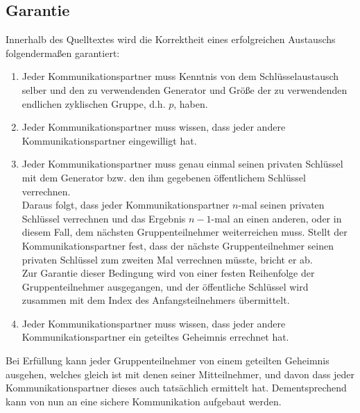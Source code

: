 \documentclass[conference]{IEEEtran}
\begin{document}
\subsection{Garantie}

Innerhalb des Quelltextes wird die Korrektheit eines erfolgreichen Austauschs folgendermaßen garantiert:

\begin{enumerate}
    \item Jeder Kommunikationspartner muss Kenntnis von dem Schlüsselaustausch selber und den zu verwendenden Generator und Größe der zu verwendenden endlichen zyklischen Gruppe, d.h. $p$, haben.
    \item Jeder Kommunikationspartner muss wissen, dass jeder andere Kommunikationspartner eingewilligt hat.
    \item Jeder Kommunikationspartner muss genau einmal seinen privaten Schlüssel
        mit dem Generator bzw. den ihm gegebenen öffentlichem Schlüssel verrechnen.\\
        Daraus folgt, dass jeder Kommunikationspartner $n$-mal seinen privaten
        Schlüssel verrechnen und das Ergebnis $n - 1$-mal an einen anderen,
        oder in diesem Fall, dem nächsten Gruppenteilnehmer weiterreichen muss.
        Stellt der Kommunikationspartner fest,
        dass der nächste Gruppenteilnehmer seinen privaten Schlüssel zum zweiten Mal
        verrechnen müsste, bricht er ab.\\
        Zur Garantie dieser Bedingung wird von einer festen Reihenfolge
        der Gruppenteilnehmer ausgegangen, und der öffentliche Schlüssel wird zusammen
        mit dem Index des Anfangsteilnehmers übermittelt.
    \item Jeder Kommunikationspartner muss wissen, dass jeder andere Kommunikationspartner
        ein geteiltes Geheimnis errechnet hat.
\end{enumerate}

Bei Erfüllung kann jeder Gruppenteilnehmer von einem geteilten Geheimnis ausgehen,
welches gleich ist mit denen seiner Mitteilnehmer, und davon dass jeder Kommunikationspartner dieses auch tatsächlich ermittelt hat. Dementsprechend kann von nun an eine sichere
Kommunikation aufgebaut werden.
\end{document}
